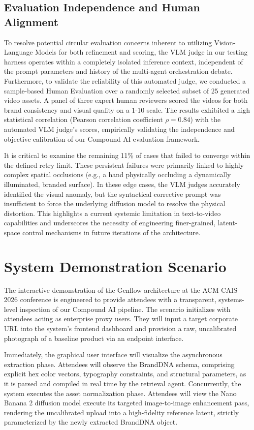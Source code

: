 \documentclass[sigconf]{acmart}
\begin{document}
\subsection{Evaluation Independence and Human Alignment}
To resolve potential circular evaluation concerns inherent to utilizing Vision-Language Models for both refinement and scoring, the VLM judge in our testing harness operates within a completely isolated inference context, independent of the prompt parameters and history of the multi-agent orchestration debate. Furthermore, to validate the reliability of this automated judge, we conducted a sample-based Human Evaluation over a randomly selected subset of 25 generated video assets. A panel of three expert human reviewers scored the videos for both brand consistency and visual quality on a 1-10 scale. The results exhibited a high statistical correlation (Pearson correlation coefficient $\rho = 0.84$) with the automated VLM judge's scores, empirically validating the independence and objective calibration of our Compound AI evaluation framework.

It is critical to examine the remaining 11\% of cases that failed to converge within the defined retry limit. These persistent failures were primarily linked to highly complex spatial occlusions (e.g., a hand physically occluding a dynamically illuminated, branded surface). In these edge cases, the VLM judges accurately identified the visual anomaly, but the syntactical corrective prompt was insufficient to force the underlying diffusion model to resolve the physical distortion. This highlights a current systemic limitation in text-to-video capabilities and underscores the necessity of engineering finer-grained, latent-space control mechanisms in future iterations of the architecture.

\section{System Demonstration Scenario}

The interactive demonstration of the Genflow architecture at the ACM CAIS 2026 conference is engineered to provide attendees with a transparent, systems-level inspection of our Compound AI pipeline. The scenario initializes with attendees acting as enterprise proxy users. They will input a target corporate URL into the system's frontend dashboard and provision a raw, uncalibrated photograph of a baseline product via an endpoint interface.

Immediately, the graphical user interface will visualize the asynchronous extraction phase. Attendees will observe the BrandDNA schema, comprising explicit hex color vectors, typography constraints, and structural parameters, as it is parsed and compiled in real time by the retrieval agent. Concurrently, the system executes the asset normalization phase. Attendees will view the Nano Banana 2 diffusion model execute its targeted image-to-image enhancement pass, rendering the uncalibrated upload into a high-fidelity reference latent, strictly parameterized by the newly extracted BrandDNA object.
\end{document}
